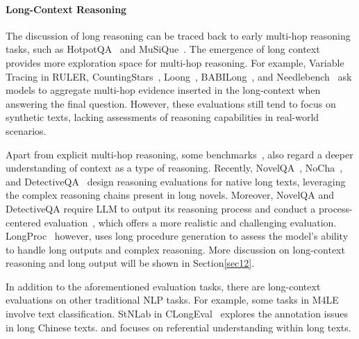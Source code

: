 
\paragraph{Long-Context Reasoning} The discussion of long reasoning can be traced back to early multi-hop reasoning tasks, such as HotpotQA~\citep{yang2018hotpotqa} and MuSiQue~\citep{trivedi2022musique}. The emergence of long context provides more exploration space for multi-hop reasoning. For example, Variable Tracing in RULER, CountingStars~\citep{song2024counting}, Loong~\citep{wang2024leave}, BABILong~\citep{kuratov2024babilong}, and Needlebench~\citep{li2024needlebench} ask models to aggregate multi-hop evidence inserted in the long-context when answering the final question. However, these evaluations still tend to focus on synthetic texts, lacking assessments of reasoning capabilities in real-world scenarios.

Apart from explicit multi-hop reasoning, some benchmarks~\citep{li2023loogle,zhang2023marathon,bai2024longbench}, also regard a deeper understanding of context as a type of reasoning. Recently, NovelQA~\citep{wang2024novelqa}, NoCha~\citep{karpinska2024one}, and DetectiveQA~\citep{xu2024detectiveqa} design reasoning evaluations for native long texts, leveraging the complex reasoning chains present in long novels. Moreover, NovelQA and DetectiveQA require LLM to output its reasoning process and conduct a process-centered evaluation~\citep{wang2024novelqa,xu2024detectiveqa}, which offers a more realistic and challenging evaluation. LongProc~\citep{ye2025longproc} however, uses long procedure generation to assess the model’s ability to handle long outputs and complex reasoning. More discussion on long-context reasoning and long output will be shown \textbf{} in Section\ref{sec12}.

In addition to the aforementioned evaluation tasks, there are long-context evaluations on other traditional NLP tasks. For example, some tasks in M4LE~\citep{kwan2023m4le} involve text classification. StNLab in CLongEval~\citep{qiu2024clongeval} explores the annotation issues in long Chinese texts. \citet{manikantan2024identifyme} and \citet{vodrahalli2024michelangelo} focuses on referential understanding within long texts.

